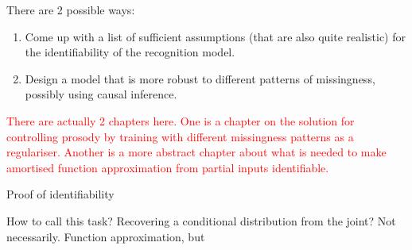 \documentclass[a4paper,12pt,twoside,openright]{report}
\newcommand{\crit}[1]{\textcolor{red}{#1}}
\begin{document}
There are 2 possible ways:

\begin{enumerate}
    \item Come up with a list of sufficient assumptions (that are also quite realistic) for the identifiability of the recognition model.
    \item Design a model that is more robust to different patterns of missingness, possibly using causal inference.
\end{enumerate}


\crit{There are actually 2 chapters here. One is a chapter on the solution for controlling prosody by training with different missingness patterns as a regulariser. Another is a more abstract chapter about what is needed to make amortised function approximation from partial inputs identifiable.}


Proof of identifiability


How to call this task? Recovering a conditional distribution from the joint? Not necessarily. Function approximation, but 


%

\cleardoublepage
{}
{}
% 
\printbibliography



\end{document}
